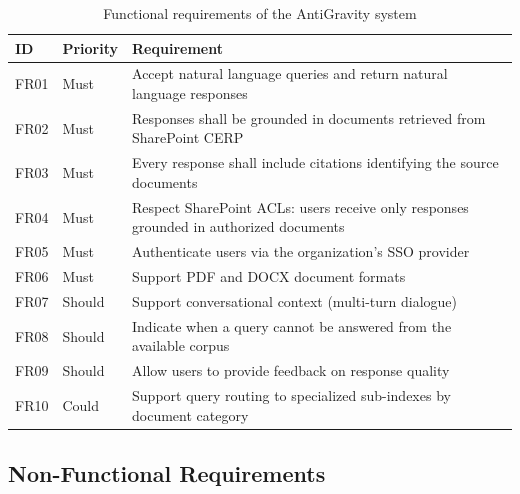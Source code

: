 \begin{table}[H]
\centering
\caption{Functional requirements of the AntiGravity system}
\label{tab:functional-requirements}
\begin{tabularx}{\textwidth}{@{}llX@{}}
\toprule
\textbf{ID} & \textbf{Priority} & \textbf{Requirement} \\
\midrule
FR01 & Must & Accept natural language queries and return natural language responses \\
FR02 & Must & Responses shall be grounded in documents retrieved from SharePoint CERP \\
FR03 & Must & Every response shall include citations identifying the source documents \\
FR04 & Must & Respect SharePoint ACLs: users receive only responses grounded in authorized documents \\
FR05 & Must & Authenticate users via the organization's SSO provider \\
FR06 & Must & Support PDF and DOCX document formats \\
FR07 & Should & Support conversational context (multi-turn dialogue) \\
FR08 & Should & Indicate when a query cannot be answered from the available corpus \\
FR09 & Should & Allow users to provide feedback on response quality \\
FR10 & Could & Support query routing to specialized sub-indexes by document category \\
\bottomrule
\end{tabularx}
\end{table}

\subsection{Non-Functional Requirements}

